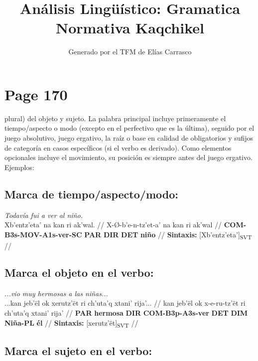 \documentclass{article}%
\title{Análisis Lingüístico: Gramatica Normativa Kaqchikel}%
\author{Generado por el TFM de Elías Carrasco}%
\begin{document}
%
\normalsize%
\maketitle%
\section{Page 170}%
\label{sec:Page170}%
plural) del objeto y sujeto. La palabra principal incluye primeramente el tiempo/aspecto %
o modo (excepto en el perfectivo que es la última), seguido por el juego absolutivo, %
juego ergativo, la raíz o base en calidad de obligatorios y sufijos de categoría en casos %
específicos (si el verbo es derivado). Como elementos opcionales incluye el movimiento, %
su posición es siempre antes del juego ergativo. Ejemplos: %
\subsection{Marca de tiempo/aspecto/modo:}%
\label{subsec:Marcadetiempo/aspecto/modo}%

%
\par\medskip%
\ex
\textit{Todavía fui a ver al niño.} \\
\begingl
\gla Xb'entz'eta' na kan ri ak'wal. //
\glb X-Ø-b'e-n-tz'et-a' na kan ri ak'wal //
\glc \textbf{COM-}\textbf{B3s-}\textbf{MOV-}\textbf{A1s-}\textbf{ver-}\textbf{SC} \textbf{PAR} \textbf{DIR} \textbf{DET} \textbf{niño} //
\glft \textbf{Sintaxis:} [Xb'entz'eta']\textsubscript{SVT} //
\endgl
\xe
%
\medskip%
\subsection{Marca el objeto en el verbo:}%
\label{subsec:Marcaelobjetoenelverbo}%

%
\par\medskip%
\ex
\textit{...vio muy hermosas a las niñas...} \\
\begingl
\gla ...kan jeb'ël ok xerutz'ët ri ch'uta'q xtani' rija'... //
\glb kan jeb'ël ok x-e-ru-tz'ët ri ch'uta'q xtani' rija' //
\glc \textbf{PAR} \textbf{hermosa} \textbf{DIR} \textbf{COM-}\textbf{B3p-}\textbf{A3s-}\textbf{ver} \textbf{DET} \textbf{DIM} \textbf{Niña-PL} \textbf{él} //
\glft \textbf{Sintaxis:} [xerutz'ët]\textsubscript{SVT} //
\endgl
\xe
%
\medskip%
\subsection{Marca el sujeto en el verbo:}%
\label{subsec:Marcaelsujetoenelverbo}%
\end{document}
